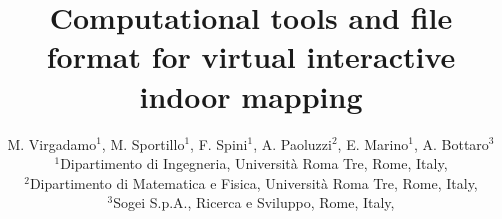 \documentclass[10pt,twocolumn,letterpaper]{article}
\begin{document}
\title{Computational tools and file format for virtual interactive indoor mapping}


\author{M. Virgadamo$^1$, M. Sportillo$^1$, F. Spini$^1$, A. Paoluzzi$^2$, E. Marino$^1$, A. Bottaro$^3$ \\[0.5mm]
{\small $^1$Dipartimento di Ingegneria, Universit\`a Roma Tre, Rome, Italy,}  \\
{\small $^2$Dipartimento di Matematica e Fisica, Universit\`a Roma Tre, Rome, Italy,}  \\
{\small $^3$Sogei S.p.A., Ricerca e Sviluppo, Rome, Italy,} 
}

\maketitle
















% 






{\small


}


\end{document}
